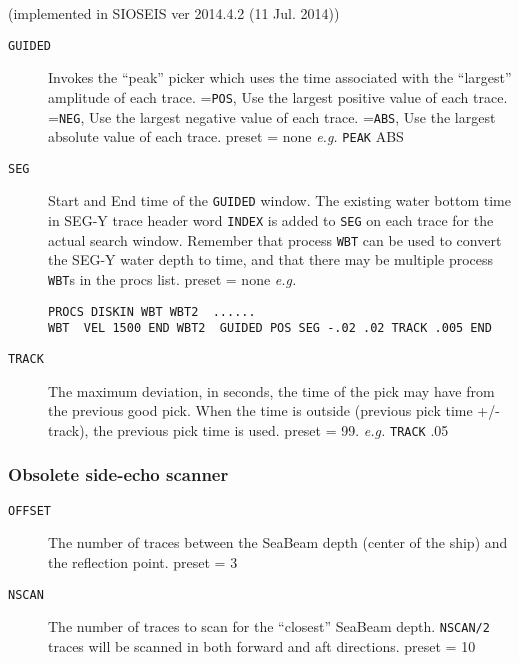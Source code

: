 (implemented in  SIOSEIS ver 2014.4.2 (11 Jul. 2014))

\begin{description}
\item[\texttt{GUIDED}] Invokes the ``peak'' picker which uses the time associated with
         the ``largest'' amplitude of each trace.
       =\texttt{POS}, Use the largest positive value of each trace.
       =\texttt{NEG}, Use the largest negative value of each trace.
       =\texttt{ABS}, Use the largest absolute value of each trace.
        \Gls{preset} = none     \textit{e.g.}   \texttt{PEAK} ABS

\item[\texttt{SEG}] Start and End time of the \texttt{GUIDED} window.  The existing water bottom
         time in SEG-Y trace header word \texttt{INDEX} is added to \texttt{SEG} on each trace
         for the actual search window.  Remember that process \texttt{WBT} can be used
         to convert the SEG-Y water depth to time, and that there may be multiple
         process \texttt{WBT}s in the procs list.
         \Gls{preset} = none
	 \textit{e.g.} 
\begin{verbatim}
PROCS DISKIN WBT WBT2  ......
WBT  VEL 1500 END WBT2  GUIDED POS SEG -.02 .02 TRACK .005 END
\end{verbatim}

\item[\texttt{TRACK}] The maximum deviation, in seconds, the time of the pick
         may have from the previous good pick.  When the time is
         outside (previous pick time +/- track), the previous
         pick time is used.
         \Gls{preset} = 99.    \textit{e.g.}  \texttt{TRACK} .05
\end{description}

\subsubsection{Obsolete side-echo scanner}

\begin{description}
\item[\texttt{OFFSET}] The number of traces between the SeaBeam depth (center of the
         ship) and the reflection point.
         \Gls{preset} = 3

\item[\texttt{NSCAN}] The number of traces to scan for the ``closest'' SeaBeam depth.
         \texttt{NSCAN/2} traces will be scanned in both forward and aft
         directions.
         \Gls{preset} = 10
\end{description}

